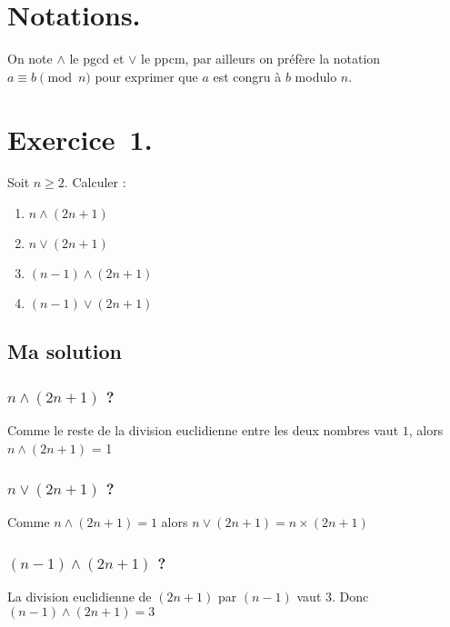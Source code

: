 \documentclass[a4paper,14pt]{extarticle} %
\begin{document}
 



\setlength{\parindent}{0pt}



\section*{Notations.}

On note $\wedge$ le pgcd et $\vee$ le ppcm, par ailleurs on préfère la notation $a\equiv b \pmod{n}$ pour exprimer que $a$ est congru à $b$ modulo $n$.

\section*{Exercice~1.}

Soit $n\geqslant 2$. Calculer :
\begin{enumerate}
\item $n \wedge (2n+1)$
\item $n \vee (2n+1)$
\item $(n-1)\wedge(2n+1)$
\item $(n-1)\vee(2n+1)$
\end{enumerate}

\subsection*{Ma solution}

\subsubsection*{$n \wedge (2n+1)$ ?}

Comme le reste de la division euclidienne entre les deux nombres vaut $1$, alors  $n \wedge (2n+1)$ = 1



\subsubsection*{$n \vee (2n+1)$ ?}

Comme $n \wedge (2n+1) = 1$ alors $n \vee (2n+1) = n \times (2n+1)$



\subsubsection*{$(n-1)\wedge(2n+1)$ ?}

La division euclidienne de $(2n+1)$ par $(n-1)$ vaut 3. Donc $(n-1)\wedge(2n+1) = 3$
\end{document}
